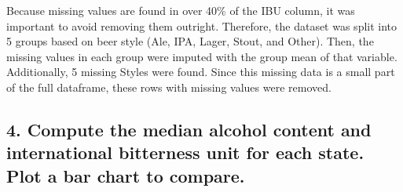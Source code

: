 \documentclass[
]{article}
\newenvironment{Shaded}{\begin{snugshade}}{\end{snugshade}}
\newcommand{\CommentTok}[1]{\textcolor[rgb]{0.56,0.35,0.01}{\textit{#1}}}
\newcommand{\FunctionTok}[1]{\textcolor[rgb]{0.00,0.00,0.00}{#1}}
\newcommand{\NormalTok}[1]{#1}
\newcommand{\OtherTok}[1]{\textcolor[rgb]{0.56,0.35,0.01}{#1}}
\newcommand{\SpecialCharTok}[1]{\textcolor[rgb]{0.00,0.00,0.00}{#1}}
\newcommand{\StringTok}[1]{\textcolor[rgb]{0.31,0.60,0.02}{#1}}
\begin{document}
\begin{Shaded}
\end{Shaded}

Because missing values are found in over 40\% of the IBU column, it was
important to avoid removing them outright. Therefore, the dataset was
split into 5 groups based on beer style (Ale, IPA, Lager, Stout, and
Other). Then, the missing values in each group were imputed with the
group mean of that variable. Additionally, 5 missing Styles were found.
Since this missing data is a small part of the full dataframe, these
rows with missing values were removed.

\hypertarget{compute-the-median-alcohol-content-and-international-bitterness-unit-for-each-state.-plot-a-bar-chart-to-compare.}{%
\subsection{4. Compute the median alcohol content and international
bitterness unit for each state. Plot a bar chart to
compare.}\label{compute-the-median-alcohol-content-and-international-bitterness-unit-for-each-state.-plot-a-bar-chart-to-compare.}}
\end{document}
